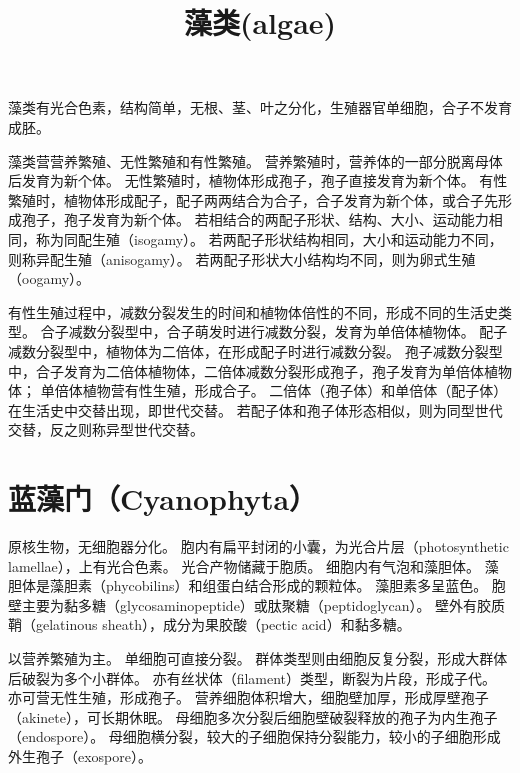\documentclass[11pt]{article}
\title{藻类(algae)}
\date{}
\begin{document}
  \maketitle

  \linenumbers
藻类有光合色素，结构简单，无根、茎、叶之分化，生殖器官单细胞，合子不发育成胚。

\newline

藻类营营养繁殖、无性繁殖和有性繁殖。
营养繁殖时，营养体的一部分脱离母体后发育为新个体。
无性繁殖时，植物体形成孢子，孢子直接发育为新个体。
有性繁殖时，植物体形成配子，配子两两结合为合子，合子发育为新个体，或合子先形成孢子，孢子发育为新个体。
若相结合的两配子形状、结构、大小、运动能力相同，称为同配生殖（isogamy）。
若两配子形状结构相同，大小和运动能力不同，则称异配生殖（anisogamy）。
若两配子形状大小结构均不同，则为卵式生殖（oogamy）。

\newline

有性生殖过程中，减数分裂发生的时间和植物体倍性的不同，形成不同的生活史类型。
合子减数分裂型中，合子萌发时进行减数分裂，发育为单倍体植物体。
配子减数分裂型中，植物体为二倍体，在形成配子时进行减数分裂。
孢子减数分裂型中，合子发育为二倍体植物体，二倍体减数分裂形成孢子，孢子发育为单倍体植物体；
单倍体植物营有性生殖，形成合子。
二倍体（孢子体）和单倍体（配子体）在生活史中交替出现，即世代交替。
若配子体和孢子体形态相似，则为同型世代交替，反之则称异型世代交替。

\section{蓝藻门（Cyanophyta）}
原核生物，无细胞器分化。
胞内有扁平封闭的小囊，为光合片层（photosynthetic lamellae），上有光合色素。
光合产物储藏于胞质。
细胞内有气泡和藻胆体。
藻胆体是藻胆素（phycobilins）和组蛋白结合形成的颗粒体。
藻胆素多呈蓝色。
胞壁主要为黏多糖（glycosaminopeptide）或肽聚糖（peptidoglycan）。
壁外有胶质鞘（gelatinous sheath），成分为果胶酸（pectic acid）和黏多糖。

\newline

以营养繁殖为主。
单细胞可直接分裂。
群体类型则由细胞反复分裂，形成大群体后破裂为多个小群体。
亦有丝状体（filament）类型，断裂为片段，形成子代。
亦可营无性生殖，形成孢子。
营养细胞体积增大，细胞壁加厚，形成厚壁孢子（akinete），可长期休眠。
母细胞多次分裂后细胞壁破裂释放的孢子为内生孢子（endospore）。
母细胞横分裂，较大的子细胞保持分裂能力，较小的子细胞形成外生孢子（exospore）。
\end{document}
